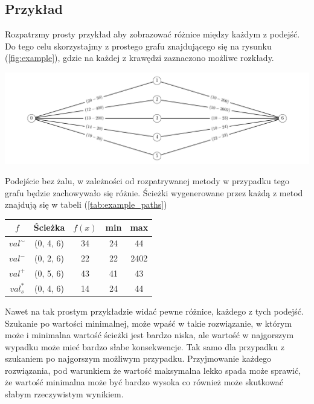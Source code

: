 \documentclass[10pt]{article}
\begin{document}
\subsection{Przykład}
Rozpatrzmy prosty przykład aby zobrazować różnice między każdym z podejść. Do tego celu skorzystajmy z prostego grafu znajdującego się na rysunku (\ref{fig:example}), gdzie na każdej z krawędzi zaznaczono możliwe rozkłady.
\begin{center}
  \includegraphics[width=\linewidth]{figures/example.pdf}
  \label{fig:example}
\end{center}

Podejście bez żalu, w zależności od rozpatrywanej metody w przypadku tego grafu będzie zachowywało się różnie. Ścieżki wygenerowane przez każdą z metod znajdują się w tabeli (\ref{tab:example_paths})
\begin{center}
  \begin{tabular}{|c|c|c|c|c|}
    \hline
    $f$          & Ścieżka   & $f(x)$ & min & max  \\ \hline
    ${val}^\sim$ & (0, 4, 6) & 34     & 24  & 44   \\ \hline
    ${val}^-$    & (0, 2, 6) & 22     & 22  & 2402 \\ \hline
    ${val}^+$    & (0, 5, 6) & 43     & 41  & 43   \\ \hline \hline
    $val^*_s$    & (0, 4, 6) & 14     & 24  & 44   \\ \hline
  \end{tabular}
  \label{tab:example_paths}
\end{center}
Nawet na tak prostym przykładzie widać pewne różnice, każdego z tych podejść. Szukanie po wartości minimalnej, może wpaść w takie rozwiązanie, w którym może i minimalna wartość ścieżki jest bardzo niska, ale wartość w najgorszym wypadku może mieć bardzo słabe konsekwencje. Tak samo dla przypadku z szukaniem po najgorszym możliwym przypadku. Przyjmowanie każdego rozwiązania, pod warunkiem że wartość maksymalna lekko spada może sprawić, że wartość minimalna może być bardzo wysoka co również może skutkować słabym rzeczywistym wynikiem.
\end{document}
